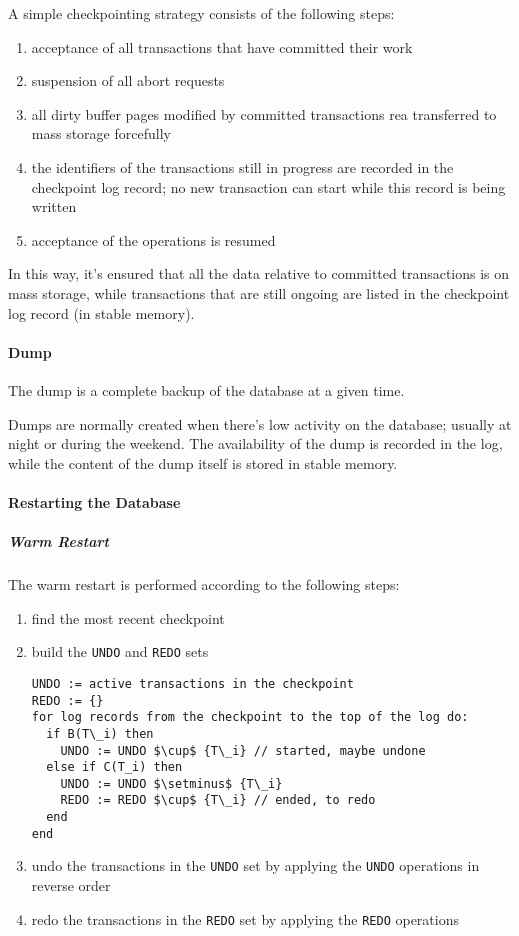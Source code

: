 \documentclass[english]{article}
\begin{document}
A simple checkpointing strategy consists of the following steps:

\begin{enumerate}
  \item acceptance of all transactions that have committed their work
  \item suspension of all abort requests
  \item all dirty buffer pages modified by committed transactions rea transferred to mass storage forcefully
  \item the identifiers of the transactions still in progress are recorded in the checkpoint log record; no new transaction can start while this record is being written
  \item acceptance of the operations is resumed
\end{enumerate}

In this way, it's ensured that all the data relative to committed transactions is on mass storage, while transactions that are still ongoing are listed in the checkpoint log record (in stable memory).

\paragraph{Dump}

The dump is a complete backup of the database at a given time.

Dumps are normally created when there's low activity on the database; usually at night or during the weekend.
The availability of the dump is recorded in the log, while the content of the dump itself is stored in stable memory.

\paragraph{Restarting the Database}

\subparagraph*{Warm Restart}
The warm restart is performed according to the following steps:

\begin{enumerate}
  \item find the most recent checkpoint
  \item build the \texttt{UNDO} and \texttt{REDO} sets
        \begin{lstlisting}
UNDO := active transactions in the checkpoint
REDO := {}
for log records from the checkpoint to the top of the log do:
  if B(T\_i) then
    UNDO := UNDO $\cup$ {T\_i} // started, maybe undone
  else if C(T_i) then
    UNDO := UNDO $\setminus$ {T\_i}
    REDO := REDO $\cup$ {T\_i} // ended, to redo
  end
end
  \end{lstlisting}
  \item undo the transactions in the \texttt{UNDO} set by applying the \texttt{UNDO} operations in reverse order
  \item redo the transactions in the \texttt{REDO} set by applying the \texttt{REDO} operations
\end{enumerate}
\end{document}
